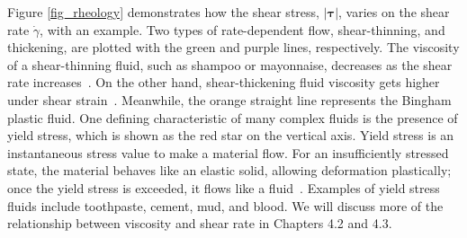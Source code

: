 \par
Figure \ref{fig_rheology} demonstrates how the shear stress, $|\bm{\tau}|$, varies on the shear rate $\dot{\gamma}$, with an example.
Two types of rate-dependent flow, shear-thinning, and thickening, are plotted with the green and purple lines, respectively.
The viscosity of a shear-thinning fluid, such as shampoo or mayonnaise, decreases as the shear rate increases~\cite{singh_introduction_2013}. On the other hand, shear-thickening fluid viscosity gets higher under shear strain~\cite{barnes_introduction_1989}. 
Meanwhile, the orange straight line represents the Bingham plastic fluid.
One defining characteristic of many complex fluids is the presence of yield stress, which is shown as the red star on the vertical axis. 
Yield stress is an instantaneous stress value to make a material flow.  
For an insufficiently stressed state, the material behaves like an elastic solid, allowing deformation plastically; once the yield stress is exceeded, it flows like a fluid~\cite{irgens_rheology_2014}. 
Examples of yield stress fluids include toothpaste, cement, mud, and blood. 
We will discuss more of the relationship between viscosity and shear rate in Chapters 4.2 and 4.3.

